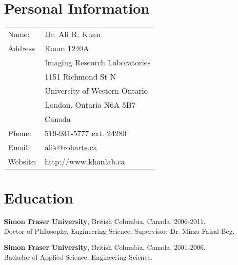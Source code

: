
\section{Personal Information}

\begin{tabular}{ll}
    Name: & Dr. Ali R. Khan \\
    Address & Room 1240A \\
    & Imaging Research Laboratories \\
    &		1151 Richmond St N \\
	&	University of Western Ontario \\
    &  London, Ontario N6A 5B7 \\
    & Canada\\
    Phone:	&	519-931-5777 ext. 24280 \\
Email:	&	alik@robarts.ca \\
Website:&	http://www.khanlab.ca \\
\end{tabular}

\section{Education}
\begin{description}
\item \textbf{Simon Fraser University}, British Columbia, Canada. 2006-2011. \\
Doctor of Philosophy, Engineering Science. Supervisor: Dr. Mirza Faisal Beg.

\item \textbf{Simon Fraser University}, British Columbia, Canada. 2001-2006. \\
Bachelor of Applied Science, Engineering Science. 

\end{description}


